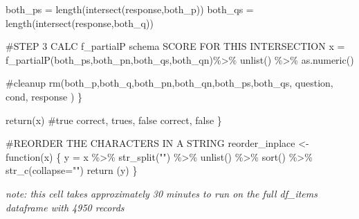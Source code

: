 \documentclass[
  letterpaper,
  DIV=11,
  numbers=noendperiod]{scrreprt}
\newenvironment{Shaded}{\begin{snugshade}}{\end{snugshade}}
\newcommand{\AttributeTok}[1]{\textcolor[rgb]{0.40,0.45,0.13}{#1}}
\newcommand{\CommentTok}[1]{\textcolor[rgb]{0.37,0.37,0.37}{#1}}
\newcommand{\ControlFlowTok}[1]{\textcolor[rgb]{0.00,0.23,0.31}{#1}}
\newcommand{\FunctionTok}[1]{\textcolor[rgb]{0.28,0.35,0.67}{#1}}
\newcommand{\NormalTok}[1]{\textcolor[rgb]{0.00,0.23,0.31}{#1}}
\newcommand{\OtherTok}[1]{\textcolor[rgb]{0.00,0.23,0.31}{#1}}
\newcommand{\SpecialCharTok}[1]{\textcolor[rgb]{0.37,0.37,0.37}{#1}}
\newcommand{\StringTok}[1]{\textcolor[rgb]{0.13,0.47,0.30}{#1}}
\begin{document}
\begin{Shaded}
\begin{Highlighting}[]
\NormalTok{    both\_ps }\OtherTok{=} \FunctionTok{length}\NormalTok{(}\FunctionTok{intersect}\NormalTok{(response,both\_p))}
\NormalTok{    both\_qs }\OtherTok{=} \FunctionTok{length}\NormalTok{(}\FunctionTok{intersect}\NormalTok{(response,both\_q))}
  
 
  \CommentTok{\#STEP 3 CALC f\_partialP schema SCORE FOR THIS INTERSECTION }
\NormalTok{  x }\OtherTok{=} \FunctionTok{f\_partialP}\NormalTok{(both\_ps,both\_pn,both\_qs,both\_qn)}\SpecialCharTok{\%\textgreater{}\%} \FunctionTok{unlist}\NormalTok{() }\SpecialCharTok{\%\textgreater{}\%} \FunctionTok{as.numeric}\NormalTok{()}
  
  \CommentTok{\#cleanup}
  \FunctionTok{rm}\NormalTok{(both\_p,both\_q,both\_pn,both\_qn,both\_ps,both\_qs, question, cond, response )   }
\NormalTok{  \}}
  
  \FunctionTok{return}\NormalTok{(x) }\CommentTok{\#true correct, trues, false correct, false}
\NormalTok{\}}


\CommentTok{\#REORDER THE CHARACTERS IN A STRING}
\NormalTok{reorder\_inplace }\OtherTok{\textless{}{-}} \ControlFlowTok{function}\NormalTok{(x)}
\NormalTok{\{}
\NormalTok{  y }\OtherTok{=}\NormalTok{  x }\SpecialCharTok{\%\textgreater{}\%} \FunctionTok{str\_split}\NormalTok{(}\StringTok{""}\NormalTok{) }\SpecialCharTok{\%\textgreater{}\%} \FunctionTok{unlist}\NormalTok{() }\SpecialCharTok{\%\textgreater{}\%} \FunctionTok{sort}\NormalTok{() }\SpecialCharTok{\%\textgreater{}\%} \FunctionTok{str\_c}\NormalTok{(}\AttributeTok{collapse=}\StringTok{""}\NormalTok{)}
  \FunctionTok{return}\NormalTok{ (y)}
\NormalTok{\}}
\end{Highlighting}
\end{Shaded}

\emph{note: this cell takes approximately 30 minutes to run on the full
df\_items dataframe with 4950 records}
\end{document}
